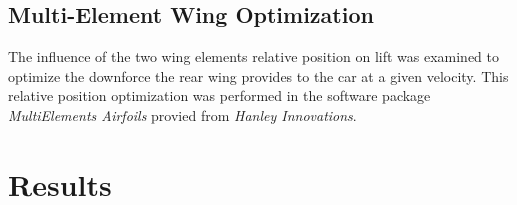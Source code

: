   \subsection{Multi-Element Wing Optimization}
  The influence of the two wing elements relative position on lift was examined to optimize the downforce the rear wing provides to the car at a given velocity. This relative position optimization was performed in the software package \textit{MultiElements Airfoils} provied from \textit{Hanley Innovations}.

\section{Results}
